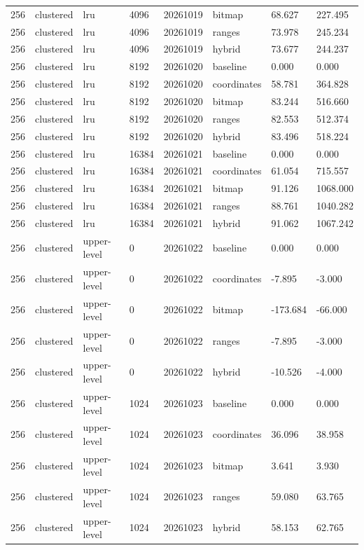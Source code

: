 \begin{tabular}{llllllll}
256 & clustered & lru & 4096 & 20261019 & bitmap & 68.627 & 227.495 \\
256 & clustered & lru & 4096 & 20261019 & ranges & 73.978 & 245.234 \\
256 & clustered & lru & 4096 & 20261019 & hybrid & 73.677 & 244.237 \\
256 & clustered & lru & 8192 & 20261020 & baseline & 0.000 & 0.000 \\
256 & clustered & lru & 8192 & 20261020 & coordinates & 58.781 & 364.828 \\
256 & clustered & lru & 8192 & 20261020 & bitmap & 83.244 & 516.660 \\
256 & clustered & lru & 8192 & 20261020 & ranges & 82.553 & 512.374 \\
256 & clustered & lru & 8192 & 20261020 & hybrid & 83.496 & 518.224 \\
256 & clustered & lru & 16384 & 20261021 & baseline & 0.000 & 0.000 \\
256 & clustered & lru & 16384 & 20261021 & coordinates & 61.054 & 715.557 \\
256 & clustered & lru & 16384 & 20261021 & bitmap & 91.126 & 1068.000 \\
256 & clustered & lru & 16384 & 20261021 & ranges & 88.761 & 1040.282 \\
256 & clustered & lru & 16384 & 20261021 & hybrid & 91.062 & 1067.242 \\
256 & clustered & upper-level & 0 & 20261022 & baseline & 0.000 & 0.000 \\
256 & clustered & upper-level & 0 & 20261022 & coordinates & -7.895 & -3.000 \\
256 & clustered & upper-level & 0 & 20261022 & bitmap & -173.684 & -66.000 \\
256 & clustered & upper-level & 0 & 20261022 & ranges & -7.895 & -3.000 \\
256 & clustered & upper-level & 0 & 20261022 & hybrid & -10.526 & -4.000 \\
256 & clustered & upper-level & 1024 & 20261023 & baseline & 0.000 & 0.000 \\
256 & clustered & upper-level & 1024 & 20261023 & coordinates & 36.096 & 38.958 \\
256 & clustered & upper-level & 1024 & 20261023 & bitmap & 3.641 & 3.930 \\
256 & clustered & upper-level & 1024 & 20261023 & ranges & 59.080 & 63.765 \\
256 & clustered & upper-level & 1024 & 20261023 & hybrid & 58.153 & 62.765 \\

\end{tabular}
